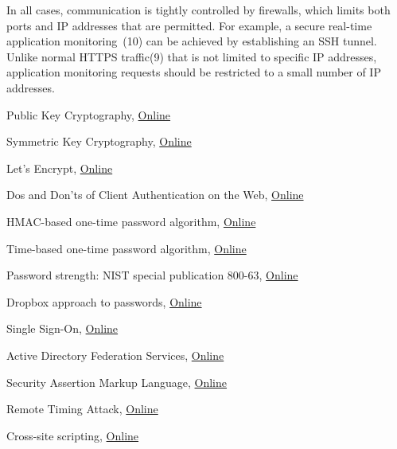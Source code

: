 \documentclass[a4paper,12pt,oneside,openright]{memoir}
\begin{document}
	In all cases, communication is tightly controlled by firewalls, which limits both ports and IP addresses that are permitted.
	For example, a secure real-time application monitoring~(10) can be achieved by establishing an SSH tunnel.
	Unlike normal HTTPS traffic(9) that is not limited to specific IP addresses, application monitoring requests should be restricted to a small number of IP addresses.
%
%
\begin{thebibliography}{5}

 Public Key Cryptography,
\href{http://en.wikipedia.org/wiki/Public-key_cryptography}{Online}

 Symmetric Key Cryptography,
\href{http://en.wikipedia.org/wiki/Symmetric-key_algorithm}{Online}

 Let's Encrypt,
\href{https://letsencrypt.org}{Online}

 Dos and Don'ts of Client Authentication on the Web,
\href{https://pdos.csail.mit.edu/papers/webauth:sec10.pdf}{Online}

 HMAC-based one-time password algorithm,
\href{https://en.wikipedia.org/wiki/HMAC-based_One-time_Password_algorithm}{Online}

 Time-based one-time password algorithm,
\href{https://en.wikipedia.org/wiki/Time-based_One-time_Password_algorithm}{Online}

 Password strength: NIST special publication 800-63,
\href{http://en.wikipedia.org/wiki/Password_strength#NIST_Special_Publication_800-63}{Online}

 Dropbox approach to passwords,
\href{https://blogs.dropbox.com/tech/2012/04/zxcvbn-realistic-password-strength-estimation}{Online}

 Single Sign-On,
\href{https://en.wikipedia.org/wiki/Single_sign-on}{Online}

 Active Directory Federation Services,
\href{https://en.wikipedia.org/wiki/Active_Directory_Federation_Services}{Online}

 Security Assertion Markup Language,
\href{https://en.wikipedia.org/wiki/Security_Assertion_Markup_Language}{Online}

 Remote Timing Attack,
\href{http://en.wikipedia.org/wiki/Timing_attack}{Online}

 Cross-site scripting,
\href{http://en.wikipedia.org/wiki/Cross-site_scripting}{Online}


\end{thebibliography}
\end{document}

